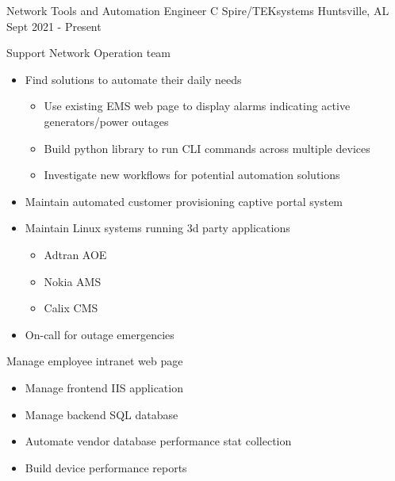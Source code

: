 
\begin{cventries}
  \cventry
    {Network Tools and Automation Engineer} %
    {C Spire/TEKsystems} %
    {Huntsville, AL} %
    {Sept 2021 - Present} %
    {
      \begin{cvitems} %
        \item {Support Network Operation team}
            \begin{itemize}
                \item {Find solutions to automate their daily needs}
                    \begin{itemize}
                        \item {Use existing EMS web page to display alarms indicating active generators/power outages}
                        \item {Build python library to run CLI commands across multiple devices}
                        \item {Investigate new workflows for potential automation solutions}
                    \end{itemize}
                \item {Maintain automated customer provisioning captive portal system}
                \item {Maintain Linux systems running 3d party applications}
                    \begin{itemize}
                        \item {Adtran AOE}
                        \item {Nokia AMS}
                        \item {Calix CMS}
                    \end{itemize}
                \item {On-call for outage emergencies}
            \end{itemize}
        \item {Manage employee intranet web page}
            \begin{itemize}
                \item {Manage frontend IIS application}
                \item {Manage backend SQL database}
                \item {Automate vendor database performance stat collection}
                \item {Build device performance reports}

\end{itemize}
\end{cvitems}}
\end{cventries}
